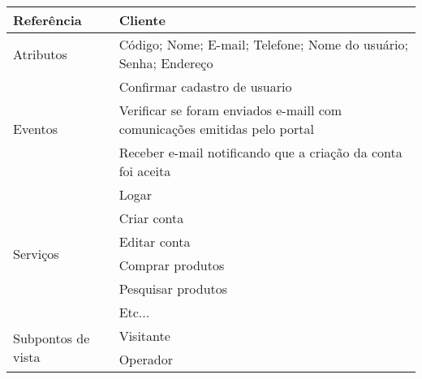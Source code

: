 \documentclass[12pt,twoside,a4paper]{article}
\begin{document}
\begin{table}[H]
\label{tab:printers}
\begin{small}
\begin{center}
    \begin{tabular}{ | l | l |}
    \hline
Referência & \textbf{Cliente}\\ \hline
Atributos & Código; Nome; E-mail; Telefone; Nome do usuário; Senha;
Endereço \\\hline
\multirow{3}{*}{Eventos} & Confirmar cadastro de usuario\\ & Verificar se foram enviados e-maill com comunicações emitidas pelo portal \\ & Receber e-mail notificando que a criação da conta foi aceita\\\hline
\multirow{6}{*}{Serviços} & Logar\\ & Criar conta\\& Editar conta\\& Comprar produtos\\& Pesquisar produtos\\& Etc...\\\hline
\multirow{2}{*}{Subpontos de vista} & Visitante \\ &
Operador\\\hline
    \end{tabular}
\end{center}    
\end{small}
\end{table}
\end{document}
